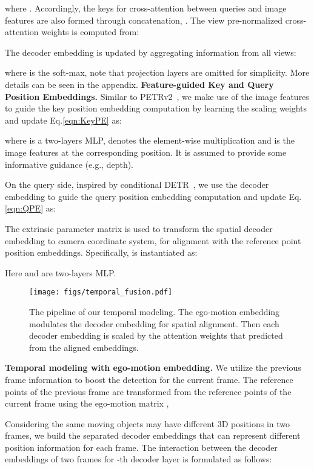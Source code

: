 \documentclass[10pt,twocolumn,letterpaper]{article}
\begin{document}
where .
Accordingly,
the keys for cross-attention between queries and image features
are also formed through concatenation, 
.
The view pre-normalized cross-attention weights 
is computed from:

The decoder embedding is updated by aggregating information from all views:

where  is the soft-max, note that projection layers are omitted for simplicity. More details can be seen in the appendix.
\noindent\textbf{Feature-guided Key and Query Position Embeddings.}
Similar to PETRv2~\cite{liu2022petrv2},
we make use of the image features to guide the key position embedding computation by learning the scaling weights
and update Eq.\ref{eqn:KeyPE} as:

where  is a two-layers MLP,  denotes the element-wise multiplication and 
is the image features at the corresponding position.
It is assumed to
provide some informative guidance
(e.g., depth). 

On the query side, inspired by conditional DETR~\cite{meng2021conditional}, we use the decoder embedding
to guide the query position embedding computation 
and update Eq.\ref{eqn:QPE} as:

The extrinsic parameter matrix 
is used to transform the spatial decoder embedding 
to camera coordinate system,
for alignment with the reference point position embeddings.
Specifically,  is instantiated as:

Here  and  are two-layers MLP.










\begin{figure}[t]
\centering
\texttt{[image: figs/temporal\_fusion.pdf]}
\caption{The pipeline of our  temporal modeling. The ego-motion embedding modulates the decoder embedding for spatial alignment. Then each decoder embedding is scaled by the attention weights  that predicted from the aligned embeddings.
}
\centering
\label{fig:temporal}
\end{figure}

\noindent\textbf{Temporal modeling
with ego-motion embedding.}
We utilize the previous frame information
to boost the detection
for the current frame.
The reference points of the previous frame
are transformed 
from the reference points
of the current frame
using the ego-motion matrix ,

Considering the same moving objects may have different 3D positions in two frames, we build the separated decoder embeddings  that can represent different position information for each frame. The interaction between the decoder embeddings of two frames for -th decoder layer is formulated as follows:
\end{document}
